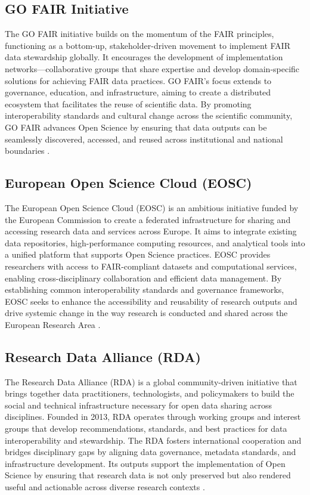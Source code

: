 \documentclass{article}
\begin{document}
\subsection{GO FAIR Initiative}
The GO FAIR initiative builds on the momentum of the FAIR principles, functioning as a bottom-up, stakeholder-driven movement to implement FAIR data stewardship globally. It encourages the development of implementation networks—collaborative groups that share expertise and develop domain-specific solutions for achieving FAIR data practices. GO FAIR’s focus extends to governance, education, and infrastructure, aiming to create a distributed ecosystem that facilitates the reuse of scientific data. By promoting interoperability standards and cultural change across the scientific community, GO FAIR advances Open Science by ensuring that data outputs can be seamlessly discovered, accessed, and reused across institutional and national boundaries \cite{mentzel_ready_2018}.

\subsection{European Open Science Cloud (EOSC)}
The European Open Science Cloud (EOSC) is an ambitious initiative funded by the European Commission to create a federated infrastructure for sharing and accessing research data and services across Europe. It aims to integrate existing data repositories, high-performance computing resources, and analytical tools into a unified platform that supports Open Science practices. EOSC provides researchers with access to FAIR-compliant datasets and computational services, enabling cross-disciplinary collaboration and efficient data management. By establishing common interoperability standards and governance frameworks, EOSC seeks to enhance the accessibility and reusability of research outputs and drive systemic change in the way research is conducted and shared across the European Research Area \cite{calatrava_survey_2023}.

\subsection{Research Data Alliance (RDA)}
The Research Data Alliance (RDA) is a global community-driven initiative that brings together data practitioners, technologists, and policymakers to build the social and technical infrastructure necessary for open data sharing across disciplines. Founded in 2013, RDA operates through working groups and interest groups that develop recommendations, standards, and best practices for data interoperability and stewardship. The RDA fosters international cooperation and bridges disciplinary gaps by aligning data governance, metadata standards, and infrastructure development. Its outputs support the implementation of Open Science by ensuring that research data is not only preserved but also rendered useful and actionable across diverse research contexts \cite{berman_research_2020}.
\end{document}
